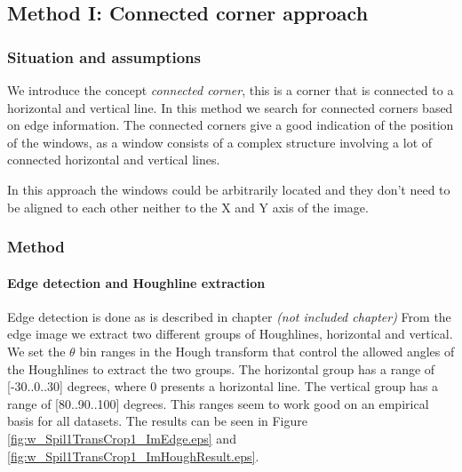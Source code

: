 





\subsection{Method I: Connected corner approach} 

\subsubsection{Situation and assumptions}
We introduce the concept \emph{connected corner}, this is a corner that is 
connected to a horizontal and vertical line.  
In this method we search for connected corners based on edge information.
The connected corners give a good indication of the position of the windows, as 
a window consists of a complex structure involving a lot of connected horizontal
and vertical lines. 

In this approach the windows could be arbitrarily located and they don't need
to be aligned to each other neither to the X and Y axis of the image.

\subsubsection{Method}
\paragraph{Edge detection and Houghline extraction}
Edge detection is done as is described in chapter 
\emph{(not included chapter)} %
From the edge image we extract two different groups of Houghlines, horizontal and %
vertical.  We set the $\theta$ bin ranges in the Hough transform that control the
allowed angles of the Houghlines to extract the two groups. The horizontal group
has a range of [-30..0..30] degrees, where 0 presents a horizontal line. The vertical
group has a range of [80..90..100] degrees. This ranges seem
to work good on an empirical basis for all datasets.
The results can be seen in Figure \ref{fig:w_Spil1TransCrop1_ImEdge.eps} and
 \ref{fig:w_Spil1TransCrop1_ImHoughResult.eps}.

